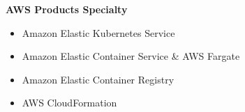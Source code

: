 \textbf{AWS Products Specialty}
    \begin{multicols}{2}
        \begin{itemize}
            \item Amazon Elastic Kubernetes Service
            \item Amazon Elastic Container Service \& AWS Fargate
            \item Amazon Elastic Container Registry
            \item AWS CloudFormation
        \end{itemize}
    \end{multicols}
